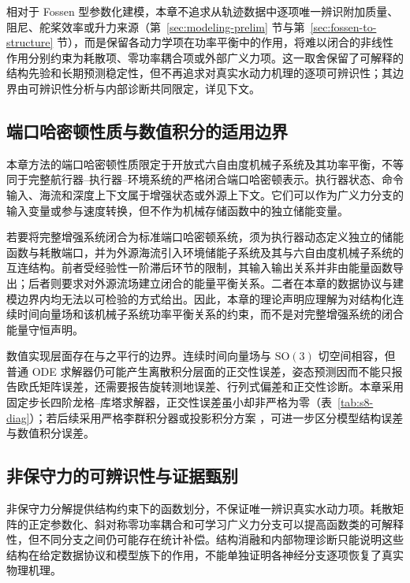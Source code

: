 \documentclass[UTF8,zihao=-4]{ctexrep}
\newcommand{\SO}{\mathrm{SO}}
\begin{document}
相对于 Fossen 型参数化建模，本章不追求从轨迹数据中逐项唯一辨识附加质量、阻尼、舵桨效率或升力来源（第~\ref{sec:modeling-prelim} 节与第~\ref{sec:fossen-to-structure} 节），而是保留各动力学项在功率平衡中的作用，将难以闭合的非线性作用分别约束为耗散项、零功率耦合项或外部广义力项。这一取舍保留了可解释的结构先验和长期预测稳定性，但不再追求对真实水动力机理的逐项可辨识性；其边界由可辨识性分析与内部诊断共同限定，详见下文。

\subsection{端口哈密顿性质与数值积分的适用边界}
\label{subsec:semantics-integration-boundary}

本章方法的端口哈密顿性质限定于开放式六自由度机械子系统及其功率平衡，不等同于完整航行器--执行器--环境系统的严格闭合端口哈密顿表示。执行器状态、命令输入、海流和深度上下文属于增强状态或外源上下文。它们可以作为广义力分支的输入变量或参与速度转换，但不作为机械存储函数中的独立储能变量。

若要将完整增强系统闭合为标准端口哈密顿系统，须为执行器动态定义独立的储能函数与耗散端口，并为外源海流引入环境储能子系统及其与六自由度机械子系统的互连结构。前者受经验性一阶滞后环节的限制，其输入输出关系并非由能量函数导出；后者则要求对外源流场建立闭合的能量平衡关系。二者在本章的数据协议与建模边界内均无法以可检验的方式给出。因此，本章的理论声明应理解为对结构化连续时间向量场和该机械子系统功率平衡关系的约束，而不是对完整增强系统的闭合能量守恒声明。

数值实现层面存在与之平行的边界。连续时间向量场与 \(\SO(3)\) 切空间相容，但普通 ODE 求解器仍可能产生离散积分层面的正交性误差，姿态预测因而不能只报告欧氏矩阵误差，还需要报告旋转测地误差、行列式偏差和正交性诊断。本章采用固定步长四阶龙格--库塔求解器，正交性误差虽小却非严格为零（表~\ref{tab:s8-diag}）；若后续采用严格李群积分器或投影积分方案 \citep{munthekaas1999liegrouprk,iserles2000liegroupmethods,hairer2006geometric}，可进一步区分模型结构误差与数值积分误差。

\subsection{非保守力的可辨识性与证据甄别}

非保守力分解提供结构约束下的函数划分，不保证唯一辨识真实水动力项。耗散矩阵的正定参数化、斜对称零功率耦合和可学习广义力分支可以提高函数类的可解释性，但不同分支之间仍可能存在统计补偿。结构消融和内部物理诊断只能说明这些结构在给定数据协议和模型族下的作用，不能单独证明各神经分支逐项恢复了真实物理机理。
\end{document}
